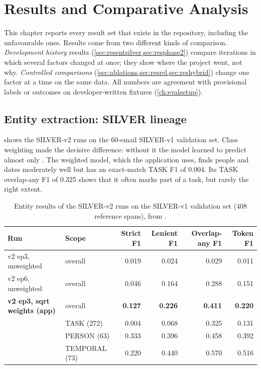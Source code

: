 \chapter{Results and Comparative Analysis}
\label{ch:results}

This chapter reports every result set that exists in the repository, including the unfavourable ones. Results come from two different kinds of comparison. \emph{Development history} results (\cref{sec:resentsilver,sec:resphase2}) compare iterations in which several factors changed at once; they show where the project went, not why. \emph{Controlled comparisons} (\cref{sec:ablations,sec:resrel,sec:reshybrid}) change one factor at a time on the same data. All numbers are agreement with provisional labels or outcomes on developer-written fixtures (\cref{ch:evalsetup}).

\section{Entity extraction: SILVER lineage}
\label{sec:resentsilver}
 shows the SILVER-v2 runs on the 60-email SILVER-v1 validation set. Class weighting made the decisive difference: without it the model learned to predict almost only . The weighted model, which the application uses, finds people and dates moderately well but has an exact-match TASK F1 of 0.004. Its TASK overlap-any F1 of 0.325 shows that it often marks part of a task, but rarely the right extent.

\begin{table}[h]
\centering
\caption[Entity results, SILVER lineage]{Entity results of the SILVER-v2 runs on the SILVER-v1 validation set (408 reference spans), from .}
\label{tab:ressilver}
\footnotesize
\begin{tabular}{@{}llrrrr@{}}
\toprule
Run & Scope & Strict F1 & Lenient F1 & Overlap-any F1 & Token F1 \\
\midrule
v2 ep3, unweighted & overall & 0.019 & 0.024 & 0.029 & 0.011 \\
v2 ep6, unweighted & overall & 0.046 & 0.164 & 0.288 & 0.151 \\
\textbf{v2 ep3, sqrt weights (app)} & overall & \textbf{0.127} & \textbf{0.226} & \textbf{0.411} & \textbf{0.220} \\
 & TASK (272) & 0.004 & 0.068 & 0.325 & 0.131 \\
 & PERSON (63) & 0.333 & 0.396 & 0.458 & 0.392 \\
 & TEMPORAL (73) & 0.220 & 0.440 & 0.570 & 0.516 \\
\bottomrule
\end{tabular}
\end{table}

